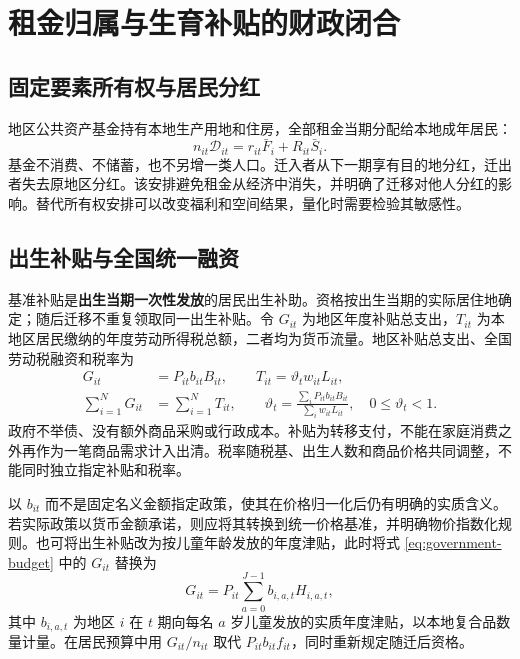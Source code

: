 \documentclass[UTF8,a4paper,zihao=-4,fontset=windows]{ctexart}
\numberwithin{equation}{section}
\begin{document}
\section{租金归属与生育补贴的财政闭合}
\label{sec:fiscal}

\subsection{固定要素所有权与居民分红}
地区公共资产基金持有本地生产用地和住房，全部租金当期分配给本地成年居民：
\begin{equation}
  n_{it}\mathcal D_{it}=r_{it}\bar F_i+R_{it}\bar S_i.
  \label{eq:rent-rebate}
\end{equation}
基金不消费、不储蓄，也不另增一类人口。迁入者从下一期享有目的地分红，迁出者失去原地区分红。该安排避免租金从经济中消失，并明确了迁移对他人分红的影响。替代所有权安排可以改变福利和空间结果，量化时需要检验其敏感性。

\subsection{出生补贴与全国统一融资}
基准补贴是\textbf{出生当期一次性发放}的居民出生补助。资格按出生当期的实际居住地确定；随后迁移不重复领取同一出生补贴。令 $G_{it}$ 为地区年度补贴总支出，$T_{it}$ 为本地区居民缴纳的年度劳动所得税总额，二者均为货币流量。地区补贴总支出、全国劳动税融资和税率为
\begin{align}
  G_{it}&=P_{it}b_{it}B_{it},\qquad
  T_{it}=\vartheta_tw_{it}L_{it},\\
  \sum_{i=1}^NG_{it}&=\sum_{i=1}^NT_{it},\qquad
  \vartheta_t=
    \frac{\sum_iP_{it}b_{it}B_{it}}{\sum_iw_{it}L_{it}},
  \quad 0\leq\vartheta_t<1.
  \label{eq:government-budget}
\end{align}
政府不举债、没有额外商品采购或行政成本。补贴为转移支付，不能在家庭消费之外再作为一笔商品需求计入出清。税率随税基、出生人数和商品价格共同调整，不能同时独立指定补贴和税率。

以 $b_{it}$ 而不是固定名义金额指定政策，使其在价格归一化后仍有明确的实质含义。若实际政策以货币金额承诺，则应将其转换到统一价格基准，并明确物价指数化规则。也可将出生补贴改为按儿童年龄发放的年度津贴，此时将式 \eqref{eq:government-budget} 中的 $G_{it}$ 替换为
\begin{equation}
  G_{it}=P_{it}\sum_{a=0}^{J-1}b_{i,a,t}H_{i,a,t},
  \label{eq:child-allowance}
\end{equation}
其中 $b_{i,a,t}$ 为地区 $i$ 在 $t$ 期向每名 $a$ 岁儿童发放的实质年度津贴，以本地复合品数量计量。在居民预算中用 $G_{it}/n_{it}$ 取代 $P_{it}b_{it}f_{it}$，同时重新规定随迁后资格。
\end{document}
